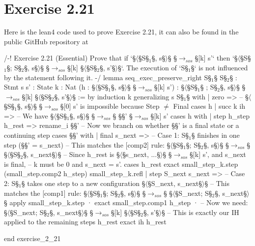 \section{Exercise 2.21}
Here is the lean4 code used to prove Exercise 2.21, it can also be found in the public GitHub repository at \citep{bachelor_thesis_code_repo}
\begin{Lean_Code}
/-!
Exercise 2.21 (Essential)
Prove that if `§\(\langle\)§S§\(_1\)§, s§\(\rangle\)§ §\(\to_{sos}\)§[k] s'` then `§\(\langle\)§S§\(_1\)§; S§\(_2\)§, s§\(\rangle\)§ §\(\to_{sos}\)§[k] §\(\langle\)§S§\(_2\)§, s'§\(\rangle\)§`.
The execution of `S§\(_1\)§` is not influenced by the statement following it.
-/
lemma seq_exec_preserve_right {S§\(_1\)§ S§\(_2\)§ : Stmt} {s s' : State} {k : Nat}
  (h : §\(\langle\)§S§\(_1\)§, s§\(\rangle\)§ §\(\to_{sos}\)§[k] s') :
  §\(\langle\)§S§\(_1\)§ ; S§\(_2\)§, s§\(\rangle\)§ §\(\to_{sos}\)§[k] §\(\langle\)§S§\(_2\)§, s'§\(\rangle\)§ := by
  induction k generalizing s S§\(_1\)§ with
  | zero =>
    -- §\(\langle\)§S§\(_1\)§, s§\(\rangle\)§ §\(\to_{sos}\)§[0] s' is impossible because Step \(\neq\) Final
    cases h
  | succ k ih =>
    -- We have §\(\langle\)§S§\(_1\)§, s§\(\rangle\)§ §\(\to_{sos}\)§ §\gamma§' §\(\to_{sos}\)§[k] s'
    cases h with
    | step h_step h_rest =>
      rename_i §\gamma§'
      -- Now we branch on whether §\gamma§' is a final state or a continuing step
      cases §\gamma§' with
      | final s_next =>
        -- Case 1: S§\(_1\)§ finishes in one step (§\gamma§' = s_next)
        -- This matches the [comp2] rule: §\(\langle\)§S§\(_1\)§; S§\(_2\)§, s§\(\rangle\)§ §\(\to_{sos}\)§ §\(\langle\)§S§\(_2\)§, s_next§\(\rangle\)§
        -- Since h_rest is §\(\langle\)§s_next, ...§\(\rangle\)§ §\(\to_{sos}\)§[k] s', and s_next is final,
        -- k must be 0 and s_next = s'.
        cases h_rest
        exact small_step_k.step (small_step.comp2 h_step) small_step_k.refl
      | step S_next s_next =>
        -- Case 2: S§\(_1\)§ takes one step to a new configuration §\(\langle\)§S_next, s_next§\(\rangle\)§
        -- This matches the [comp1] rule: §\(\langle\)§S§\(_1\)§; S§\(_2\)§, s§\(\rangle\)§ §\(\to_{sos}\)§ §\(\langle\)§S_next; S§\(_2\)§, s_next§\(\rangle\)§
        apply small_step_k.step
        · exact small_step.comp1 h_step
        · -- Now we need: §\(\langle\)§S_next; S§\(_2\)§, s_next§\(\rangle\)§ §\(\to_{sos}\)§[k] §\(\langle\)§S§\(_2\)§, s'§\(\rangle\)§
          -- This is exactly our IH applied to the remaining steps h_rest
          exact ih h_rest

end exercise_2_21


\end{Lean_Code}
